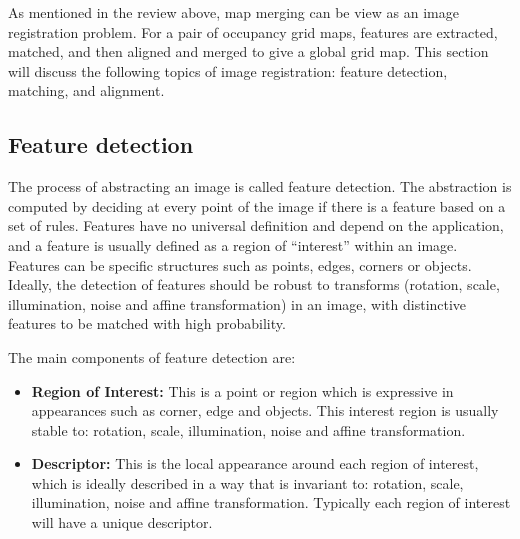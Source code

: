 As mentioned in the review above, map merging can be view as an image registration problem. For a pair of occupancy grid maps, features are extracted, matched, and then aligned and merged to give a global grid map. This section will discuss the following topics of image registration: feature detection, matching, and alignment. 


\subsection{Feature detection}

The process of abstracting an image is called feature detection. The abstraction is computed by deciding at every point of the image if there is a feature based on a set of rules. Features have no universal definition and depend on the application, and a feature is usually defined as a region of ``interest'' within an image. Features can be specific structures such as points, edges, corners or objects. Ideally, the detection of features should be robust to transforms (rotation, scale, illumination, noise and affine transformation) in an image, with distinctive features to be matched with high probability. 

The main components of feature detection are:

\begin{itemize}
    \item \textbf{Region of Interest:} This is a point or region which is expressive in appearances such as corner, edge and objects. This interest region is usually stable to: rotation, scale, illumination, noise and affine transformation.
    \item \textbf{Descriptor:} This is the local appearance around each region of interest, which is ideally described in a way that is invariant to: rotation, scale, illumination, noise and affine transformation. Typically each region of interest will have a unique descriptor. 
\end{itemize}

